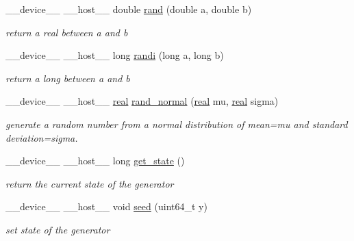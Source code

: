 \begin{DoxyCompactItemize}
\+\_\+\+\_\+device\+\_\+\+\_\+ \+\_\+\+\_\+host\+\_\+\+\_\+ double \hyperlink{structrnd__gen__t_a0ccf64e18ecb0f64349863ec6883d9c2}{rand} (double a, double b)
\begin{DoxyCompactList}\small\item\em return a real between a and b \end{DoxyCompactList}\item 
\mbox{\label{structrnd__gen__t_ae8f219398f4cf6b4db8b00ea390cf97b}} 
\+\_\+\+\_\+device\+\_\+\+\_\+ \+\_\+\+\_\+host\+\_\+\+\_\+ long \hyperlink{structrnd__gen__t_ae8f219398f4cf6b4db8b00ea390cf97b}{randi} (long a, long b)
\begin{DoxyCompactList}\small\item\em return a long between a and b \end{DoxyCompactList}\item 
\+\_\+\+\_\+device\+\_\+\+\_\+ \+\_\+\+\_\+host\+\_\+\+\_\+ \hyperlink{vgg__util_8h_a1082d08aaa761215ec83e7149f27ad16}{real} \hyperlink{structrnd__gen__t_a6015e76eb30c192e3b64a9bc2b546535}{rand\+\_\+normal} (\hyperlink{vgg__util_8h_a1082d08aaa761215ec83e7149f27ad16}{real} mu, \hyperlink{vgg__util_8h_a1082d08aaa761215ec83e7149f27ad16}{real} sigma)
\begin{DoxyCompactList}\small\item\em generate a random number from a normal distribution of mean=mu and standard deviation=sigma. \end{DoxyCompactList}\item 
\mbox{\label{structrnd__gen__t_a45c7eb16a8f87359f70e007a00cf92e4}} 
\+\_\+\+\_\+device\+\_\+\+\_\+ \+\_\+\+\_\+host\+\_\+\+\_\+ long \hyperlink{structrnd__gen__t_a45c7eb16a8f87359f70e007a00cf92e4}{get\+\_\+state} ()
\begin{DoxyCompactList}\small\item\em return the current state of the generator \end{DoxyCompactList}\item 
\mbox{\label{structrnd__gen__t_a0e43f9b2d156cb2535bfa1a88cd9eb25}} 
\+\_\+\+\_\+device\+\_\+\+\_\+ \+\_\+\+\_\+host\+\_\+\+\_\+ void \hyperlink{structrnd__gen__t_a0e43f9b2d156cb2535bfa1a88cd9eb25}{seed} (uint64\+\_\+t y)
\begin{DoxyCompactList}\small\item\em set state of the generator \end{DoxyCompactList}\end{DoxyCompactItemize}
